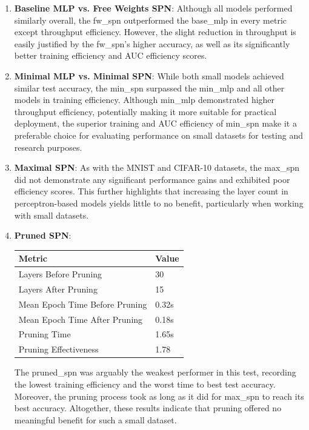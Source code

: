 \begin{enumerate}
\item \textbf{Baseline MLP vs. Free Weights SPN}: Although all models performed similarly overall, the fw\_spn outperformed the base\_mlp in every metric except throughput efficiency. However, the slight reduction in throughput is easily justified by the fw\_spn’s higher accuracy, as well as its significantly better training efficiency and AUC efficiency scores.
\item \textbf{Minimal MLP vs. Minimal SPN}: While both small models achieved similar test accuracy, the min\_spn surpassed the min\_mlp and all other models in training efficiency. Although min\_mlp demonstrated higher throughput efficiency, potentially making it more suitable for practical deployment, the superior training and AUC efficiency of min\_spn make it a preferable choice for evaluating performance on small datasets for testing and research purposes.
\item \textbf{Maximal SPN}: As with the MNIST and CIFAR-10 datasets, the max\_spn did not demonstrate any significant performance gains and exhibited poor efficiency scores. This further highlights that increasing the layer count in perceptron-based models yields little to no benefit, particularly when working with small datasets.
\item \textbf{Pruned SPN}:
\begin{center}  %
\begin{tabular}{|l|l|}
\hline
\textbf{Metric} & \textbf{Value} \\
\hline
Layers Before Pruning & 30 \\
Layers After Pruning & 15 \\
Mean Epoch Time Before Pruning & 0.32s \\
Mean Epoch Time After Pruning & 0.18s \\
Pruning Time & 1.65s \\
Pruning Effectiveness & 1.78 \\
\hline
\end{tabular}
\end{center}
The pruned\_spn was arguably the weakest performer in this test, recording the lowest training efficiency and the worst time to best test accuracy. Moreover, the pruning process took as long as it did for max\_spn to reach its best accuracy. Altogether, these results indicate that pruning offered no meaningful benefit for such a small dataset.

\end{enumerate}


